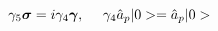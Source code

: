 \begin{equation}                                               
\gamma_{5} \mbox{\boldmath $\sigma$} = i \gamma_{4} \mbox{\boldmath $\gamma$},~~~~
\gamma_{4} \hat{a}_{p} |0> = \hat{a}_{p} |0> 
\end{equation}

